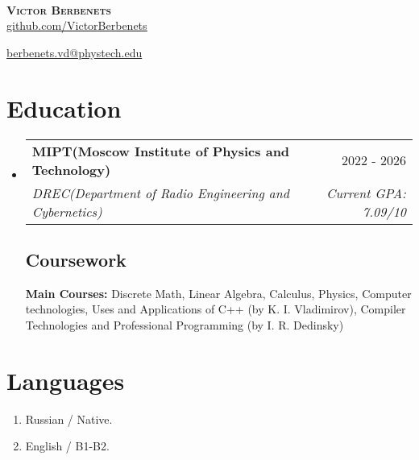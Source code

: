 \documentclass[letterpaper,11pt]{article}
\makeatletter
\newcommand{\resumeSubheading}[4]{
  \vspace{-2pt}\item
    \begin{tabular*}{0.97\textwidth}[t]{l@{\extracolsep{\fill}}r}
      \textbf{#1} & #2 \\
      \textit{\small#3} & \textit{\small #4} \\
    \end{tabular*}\vspace{-7pt}
}
\newcommand{\resumeSubHeadingListStart}{\begin{itemize}[leftmargin=0.15in, label={}]}
\newcommand{\resumeSubHeadingListEnd}{\end{itemize}}
\makeatother
\begin{document}
\
\vspace{+5pt}

\begin{center}
    \textbf{\Huge \scshape Victor Berbenets} \\ \vspace{8pt}
    \small 
    \href{https://github.com/VictorBerbenets}{\underline{github.com/VictorBerbenets}} $  $

    {\underline{berbenets.vd@phystech.edu}}
\end{center}

\section{Education}
  \resumeSubHeadingListStart
  
    \resumeSubheading
      {MIPT(Moscow Institute of Physics and Technology)}{2022 - 2026}
      {DREC(Department of Radio Engineering and Cybernetics)}{Current GPA: 7.09/10}
      

    \vspace{+10pt}

    \subsection{Coursework}
      \textbf{Main Courses:} Discrete Math, Linear Algebra, Calculus, Physics,
      Computer technologies, Uses and Applications of C++ (by K. I. Vladimirov),
      Compiler Technologies and Professional Programming (by I. R. Dedinsky)\\


  \resumeSubHeadingListEnd
\section{Languages}
 \begin{itemize}[leftmargin=0.15in, label={}]
    \begin{enumerate}
        \item Russian / Native.
        \item English / B1-B2.
    \end{enumerate}
 \end{itemize}
\end{document}
